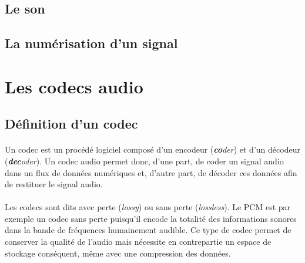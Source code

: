 \documentclass{article}
\begin{document}
    \subsection{Le son}





    \subsection{La numérisation d'un signal}
    \label{audionumerique}


    \newpage
    \section{Les codecs audio}
    \subsection{Définition d'un codec}
    \paragraph{}
    Un codec est un procédé logiciel composé d'un encodeur (\emph{\textbf{co}der}) et d'un décodeur (\emph{\textbf{dec}oder})\cite{wiki:codec}. Un codec audio permet donc, d'une part, de coder un signal audio dans un flux de données numériques et, d'autre part, de décoder ces données afin de restituer le signal audio.

    \paragraph{}
    Les codecs sont dits avec perte (\emph{lossy}) ou sans perte (\emph{lossless}). Le PCM est par exemple un codec sans perte puisqu'il encode la totalité des informations sonores dans la bande de fréquences humainement audible. Ce type de codec permet de conserver la qualité de l'audio mais nécessite en contrepartie un espace de stockage conséquent, même avec une compression des données.
\end{document}
